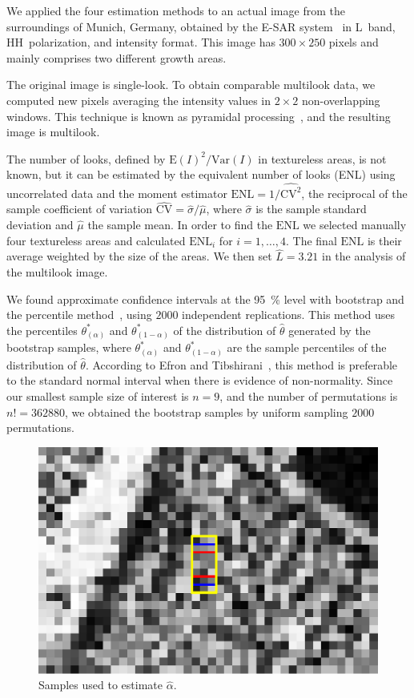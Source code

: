 \documentclass[twocolumn]{svjour3}
\begin{document}
We applied the four estimation methods to an actual image from the surroundings of Munich, Germany, obtained by the E-SAR system~\cite{Horn1996} in L~band, HH~polarization, and intensity format. 
This image has $300\times250$ pixels and mainly comprises two different growth areas.

The original image is single-look.
To obtain comparable multilook data, we computed new pixels averaging the intensity values in $2\times2$ non-overlapping windows. This technique is known as pyramidal processing~\cite{Adelson1984}, and the resulting image is multilook.

The number of looks, defined by ${\text{E}(I)^2}/{\text{Var}(I)}$ in textureless areas, is not known, but it can be estimated by the equivalent number of looks (ENL) using uncorrelated data and the moment estimator
$\text{ENL}={1}/{\widehat{\text{CV}^2}}$, the reciprocal of the sample coefficient of variation $\widehat{\text{CV}}={\widehat{\sigma}}/{\widehat\mu}$, where $\widehat{\sigma}$ is the sample standard deviation and $\widehat\mu$ the sample mean.
In order to find the $\text{ENL}$ we selected manually four textureless areas and calculated $\text{ENL}_i$ for $i=1, \ldots, 4$. 
The final $\text{ENL}$ is their average weighted by the size of the areas. 
We then set $\widehat L=3.21$ in the analysis of the multilook image.

We found approximate confidence intervals at the \SI{95}{\percent} level with bootstrap and the percentile method~\cite{Davison1997}, using $2000$ independent replications.
This method uses the percentiles $\theta^*_{(\alpha)}$ and $\theta^*_{(1-\alpha)}$ of the distribution of $\widehat{\theta} $ generated by the bootstrap samples, where $\theta^*_{(\alpha)}$ and $\theta^*_{(1-\alpha)}$ are the sample percentiles of the distribution of $\widehat{\theta} $. 
According to Efron and Tibshirani~\cite{Efron93}, this method is preferable to the standard normal interval when there is evidence of non-normality.
Since our smallest sample size of interest is $n=9$, and the number of permutations is $n!=362880$, we obtained the bootstrap samples by uniform sampling $2000$ permutations.

\begin{figure}[hbt]
	\centering
	\includegraphics[width=0.8\linewidth]{../../../Figures/PaperTesis/TresMuestrasAgrandada.eps}
	\caption{Samples used to estimate $\widehat{\alpha}$.}\label{TresMuestras} 
\end{figure}
\end{document}

